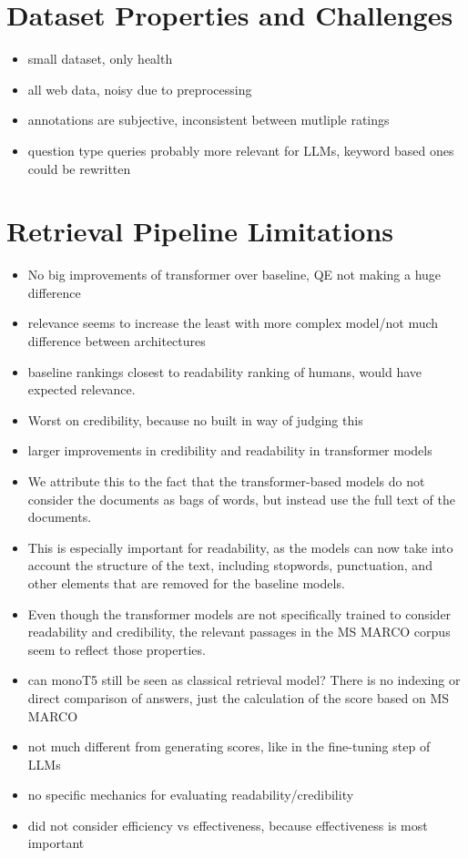 \section{Dataset Properties and Challenges}
\begin{itemize}
    \item small dataset, only health
    \item all web data, noisy due to preprocessing
    \item annotations are subjective, inconsistent between mutliple ratings
    \item question type queries probably more relevant for LLMs, keyword based ones could be rewritten
\end{itemize}

\section{Retrieval Pipeline Limitations}
\begin{itemize}
    \item No big improvements of transformer over baseline, QE not making a huge difference
    \item relevance seems to increase the least with more complex model/not much difference between architectures
    \item baseline rankings closest to readability ranking of humans, would have expected relevance.
    \item Worst on credibility, because no built in way of judging this
    \item larger improvements in credibility and readability in transformer models
    \item We attribute this to the fact that the transformer-based models do not consider the documents as bags of words, but instead use the full text of the documents.
    \item This is especially important for readability, as the models can now take into account the structure of the text, including stopwords, punctuation, and other elements that are removed for the baseline models.
    \item Even though the transformer models are not specifically trained to consider readability and credibility, the relevant passages in the MS MARCO corpus seem to reflect those properties.
    \item can monoT5 still be seen as classical retrieval model? There is no indexing or direct comparison of answers, just the calculation of the score based on MS MARCO
    \item not much different from generating scores, like in the fine-tuning step of LLMs
    \item no specific mechanics for evaluating readability/credibility
    \item did not consider efficiency vs effectiveness, because effectiveness is most important
\end{itemize}


